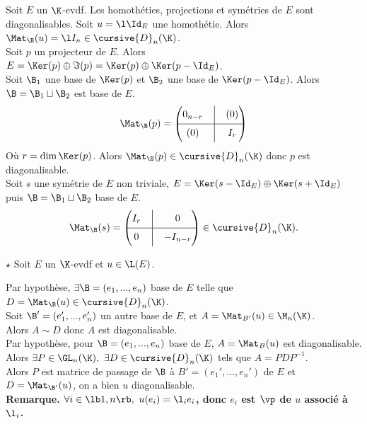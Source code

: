 \documentclass[11pt]{article}
\renewcommand*{\D}{\cursive{D}}
\begin{document}
\begin{prop}{}{}
    Soit $E$ un $\K$-evdf. Les homothéties, projections et symétries de $E$ sont diagonalisables.
    \tcblower
     Soit $u=\l\Id_E$ une homothétie. Alors $\Mat_\B(u)=\l I_n\in\D_n(\K)$.\\
     Soit $p$ un projecteur de $E$. Alors $E=\Ker(p)\oplus\Im(p)=\Ker(p)\oplus\Ker(p-\Id_E)$.\\
    Soit $\B_1$ une base de $\Ker(p)$ et $\B_2$ une base de $\Ker(p-\Id_E)$. Alors $\B=\B_1\sqcup\B_2$ est base de $E$.
    \begin{equation*}
        \Mat_\B(p)=\begin{pmatrix} 0_{n-r} & \Big| & (0) \\ \hline (0) & \Big| & I_{r}\end{pmatrix}
    \end{equation*}
    Où $r=\dim\Ker(p)$. Alors $\Mat_\B(p)\in\D_n(\K)$ donc $p$ est diagonalisable.\\
     Soit $s$ une symétrie de $E$ non triviale, $E=\Ker(s-\Id_E)\oplus\Ker(s+\Id_E)$ puis $\B=\B_1\sqcup\B_2$ base de $E$.
    \begin{equation*}
        \Mat_\B(s) = \begin{pmatrix}I_r&\Big|&0\\\hline0&\Big|&-I_{n-r}\end{pmatrix}\in\D_n(\K).
    \end{equation*}
\end{prop}

\begin{prop}{$\star$}{}
    Soit $E$ un $\K$-evdf et $u\in\L(E)$.
    \begin{center}
    \end{center}
    \tcblower
    \boxed{\ra} Par hypothèse, $\exists\B=(e_1,...,e_n)$ base de $E$ telle que $D=\Mat_\B(u)\in\D_n(\K)$.\\
    Soit $\B'=(e_1',...,e_n')$ un autre base de $E$, et $A=\Mat_{B'}(u)\in\M_n(\K)$.\\
    Alors $A\sim D$ donc $A$ est diagonalisable.\\
    \boxed{\la} Par hypothèse, pour $\B=(e_1,...,e_n)$ base de $E$, $A=\Mat_B(u)$ est diagonalisable.\\
    Alors $\exists P \in \GL_n(\K), ~ \exists D \in \D_n(\K)$ tels que $A=PDP^{-1}$.\\
    Alors $P$ est matrice de passage de $\B$ à $B'=(e_1',...,e_n')$ de $E$ et $D=\Mat_{\B'}(u)$, on a bien $u$ diagonalisable.\\
    \bf{Remarque.}  $\forall i \in \lb1,n\rb, ~ u(e_i)=\l_i e_i$, donc $e_i$ est $\vp$ de $u$ associé à $\l_i$. 
\end{prop}
\end{document}
